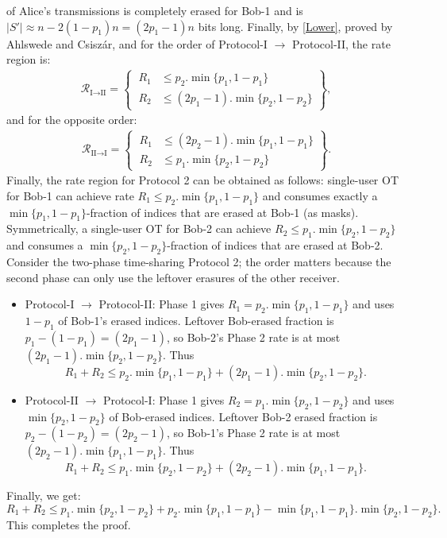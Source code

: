 \documentclass[runningheads]{llncs}
\begin{document}
of Alice’s transmissions is completely erased for Bob-1 and is $\lvert S'\rvert\approx n-2(1-p_1)n = (2p_1-1)n$ bits long. Finally, by \eqref{Lower}, proved by Ahlswede and Csiszár, and  for the order of Protocol-I $\to$ Protocol-II, the rate region is:
\begin{align*}
\mathcal{R}_{\text{I$\to$II}} = \left\{\ 
\begin{aligned}
R_1 &\leq p_2.\min\{p_1,1 - p_1\} \\
R_2 &\leq (2p_1-1) .\min\{p_2,1 - p_2\}
\end{aligned}
\right\},
\end{align*}
and for the opposite order: 
\begin{align*}
\mathcal{R}_{\text{II$\to$I}} = \left\{\ 
\begin{aligned}
R_1 &\leq (2p_2-1).\min\{ p_1,1 - p_1\} \\
R_2 &\leq p_1.\min \{p_2, 1 - p_2\}
\end{aligned}
\right\}.
\end{align*}
Finally, the rate region for Protocol 2 can be obtained as follows:
single-user OT for Bob-1 can achieve rate $R_1\leq p_2.\min\{p_1,1-p_1\}$ and consumes exactly a $\min\{p_1,1-p_1\}$-fraction of indices that are erased at Bob-1 (as masks). Symmetrically, a single-user OT for Bob-2 can achieve $R_2\leq p_1.\min\{p_2,1-p_2\}$ and consumes a $\min\{p_2,1-p_2\}$-fraction of indices that are erased at Bob-2. Consider the two-phase time-sharing Protocol 2; the order matters because the second phase can only use the leftover erasures of the other receiver.
\begin{itemize}
    \item Protocol-I $\to$ Protocol-II: Phase 1 gives $R_1 = p_2.\min\{p_1,1-p_1\}$ and uses $1-p_1$ of Bob-1’s erased indices. Leftover Bob-erased fraction is $p_1-(1-p_1) = (2p_1-1)$, so Bob-2’s Phase 2 rate is at most $(2p_1-1).\min\{p_2,1-p_2\}$. Thus 
    \[
    R_1 + R_2 \leq p_2.\min\{p_1,1-p_1\} + (2p_1-1).\min\{p_2,1-p_2\}. 
    \]
    \item  Protocol-II $\to$ Protocol-I: Phase 1 gives $R_2 = p_1.\min\{p_2,1-p_2\}$ and uses $\min\{p_2,1-p_2\}$ of Bob-erased indices. Leftover Bob-2 erased fraction is $p_2-(1-p_2) = (2p_2-1)$, so Bob-1’s Phase 2 rate is at most $(2p_2-1).\min\{p_1,1-p_1\}$. Thus 
    \[
    R_1 + R_2 \leq p_1.\min\{p_2,1-p_2\} + (2p_2-1).\min\{p_1,1-p_1\}.
    \]
\end{itemize}
Finally, we get: 
\[
R_1 + R_2 \leq p_1.\min\{p_2,1-p_2\} + p_2.\min\{p_1,1-p_1\} - \min\{p_1,1-p_1\}.\min\{p_2,1-p_2\}.
\]
This completes the proof. 



\end{document}
